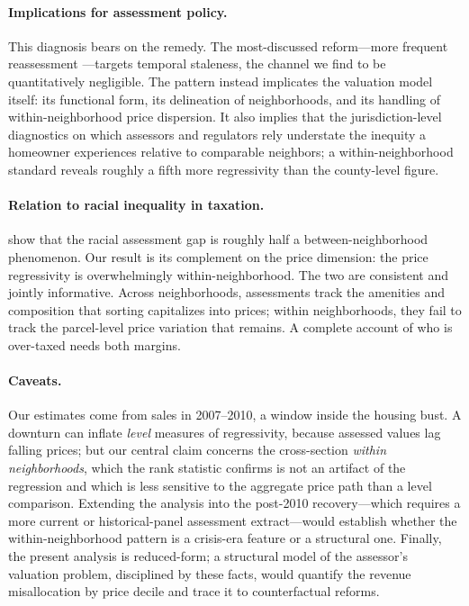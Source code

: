 \documentclass[12pt, letterpaper]{article}
\begin{document}
\paragraph{Implications for assessment policy.} This diagnosis bears on the remedy. The most-discussed reform---more frequent reassessment \citep{mikesell1980property, hou2023assessment}---targets temporal staleness, the channel we find to be quantitatively negligible. The pattern instead implicates the valuation model itself: its functional form, its delineation of neighborhoods, and its handling of within-neighborhood price dispersion. It also implies that the jurisdiction-level diagnostics on which assessors and regulators rely \citep{iaao2013ratio} understate the inequity a homeowner experiences relative to comparable neighbors; a within-neighborhood standard reveals roughly a fifth more regressivity than the county-level figure.

\paragraph{Relation to racial inequality in taxation.} \citet{avenancioleon2022assessment} show that the racial assessment gap is roughly half a between-neighborhood phenomenon. Our result is its complement on the price dimension: the price regressivity is overwhelmingly within-neighborhood. The two are consistent and jointly informative. Across neighborhoods, assessments track the amenities and composition that sorting capitalizes into prices; within neighborhoods, they fail to track the parcel-level price variation that remains. A complete account of who is over-taxed needs both margins.

\paragraph{Caveats.} Our estimates come from sales in 2007--2010, a window inside the housing bust. A downturn can inflate \emph{level} measures of regressivity, because assessed values lag falling prices; but our central claim concerns the cross-section \emph{within neighborhoods}, which the rank statistic confirms is not an artifact of the regression and which is less sensitive to the aggregate price path than a level comparison. Extending the analysis into the post-2010 recovery---which requires a more current or historical-panel assessment extract---would establish whether the within-neighborhood pattern is a crisis-era feature or a structural one. Finally, the present analysis is reduced-form; a structural model of the assessor's valuation problem, disciplined by these facts, would quantify the revenue misallocation by price decile and trace it to counterfactual reforms.
\end{document}
